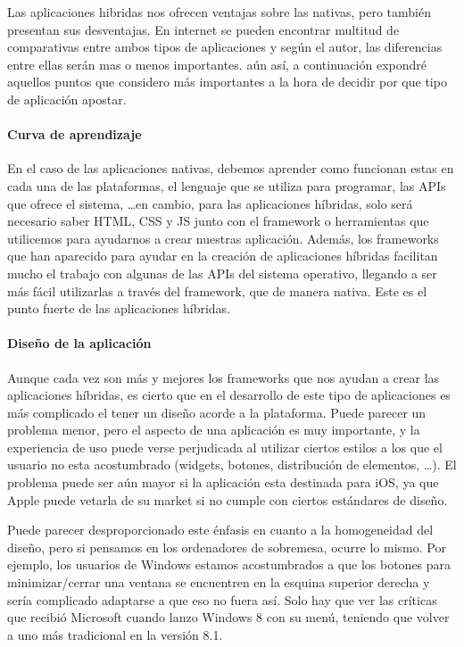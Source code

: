 Las aplicaciones hibridas nos ofrecen ventajas sobre las nativas, pero también presentan sus desventajas. En internet se pueden encontrar multitud de comparativas entre ambos tipos de aplicaciones y según el autor, las diferencias entre ellas serán mas o menos importantes. aún así, a continuación expondré aquellos puntos que considero más importantes a la hora de decidir por que tipo de aplicación apostar.

\paragraph{Curva de aprendizaje} En el caso de las aplicaciones nativas, debemos aprender como funcionan estas en cada una de las plataformas, el lenguaje que se utiliza para programar, las APIs que ofrece el sistema, \ldots en cambio, para las aplicaciones híbridas, solo será necesario saber HTML, CSS y JS junto con el framework o herramientas que utilicemos para ayudarnos a crear nuestras aplicación. Además, los frameworks que han aparecido para ayudar en la creación de aplicaciones híbridas facilitan mucho el trabajo con algunas de las \glspl{API} del sistema operativo, llegando a ser más fácil utilizarlas a través del framework, que de manera nativa. Este es el punto fuerte de las aplicaciones híbridas.

\paragraph{Diseño de la aplicación} Aunque cada vez son más y mejores los frameworks que nos ayudan a crear las aplicaciones híbridas, es cierto que en el desarrollo de este tipo de aplicaciones es más complicado el tener un diseño acorde a la plataforma. Puede parecer un problema menor, pero el aspecto de una aplicación es muy importante, y la experiencia de uso puede verse perjudicada al utilizar ciertos estilos a los que el usuario no esta acostumbrado (widgets, botones, distribución de elementos, \ldots). El problema puede ser aún mayor si la aplicación esta destinada para iOS, ya que Apple puede vetarla de su market si no cumple con ciertos estándares de diseño.

Puede parecer desproporcionado este énfasis en cuanto a la homogeneidad del diseño, pero si pensamos en los ordenadores de sobremesa, ocurre lo mismo. Por ejemplo, los usuarios de Windows estamos acostumbrados a que los botones para minimizar/cerrar una ventana se encuentren en la esquina superior derecha y sería complicado adaptarse a que eso no fuera así. Solo hay que ver las críticas que recibió Microsoft cuando lanzo Windows 8 con su menú, teniendo que volver a uno más tradicional en la versión 8.1.

